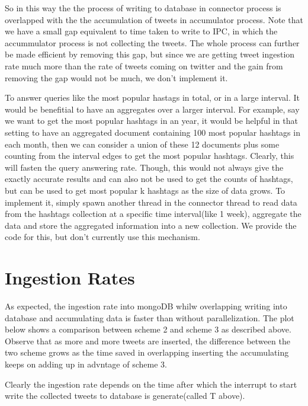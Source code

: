 \documentclass[letterpaper,10pt,english]{sphinxmanual}
\begin{document}
So in this way the the process of writing to database in connector process is overlapped with the the accumulation of tweets in accumulator process. Note that we have a small gap equivalent to time taken to write to IPC, in which the accummulator process is not collecting the tweets. The whole process can further be made efficient by removing this gap, but since we are getting tweet ingestion rate much more than the rate of tweets coming on twitter and the gain from removing the gap would not be much, we don’t implement it.

To answer queries like the most popular hastags in total, or in a large interval. It would be benefitial to have an aggregates over a larger interval. For example, say we want to get the most popular hashtags in an year, it would be helpful in that setting to have an aggregated document containing 100 most popular hashtags in each month, then we can consider a union of these 12 documents plus some counting from the interval edges to get the most popular hashtags. Clearly, this will fasten the query answering rate. Though, this would not always give the exactly accurate results and can also not be used to get the counts of hashtags, but can be used to get most popular k hashtags as the size of data grows. To implement it, simply spawn another thread in the connector thread to read data from the hashtags collection at a specific time interval(like 1 week), aggregate the data and store the aggregated information into a new collection. We provide the code for this, but don’t currently use this mechanism.


\section{Ingestion Rates}
\label{\detokenize{mongoDB_data_ingestion:ingestion-rates}}
As expected, the ingestion rate into mongoDB whilw overlapping writing into database and accumulating data is faster than without parallelization. The plot below shows a comparison between scheme 2 and scheme 3 as described above. Observe that as more and more tweets are inserted, the difference between the two scheme grows as the time saved in overlapping inserting the accumulating keeps on adding up in advntage of scheme 3.

\noindent{}

Clearly the ingestion rate depends on the time after which the interrupt to start write the collected tweets to database is generate(called T above).
\end{document}

